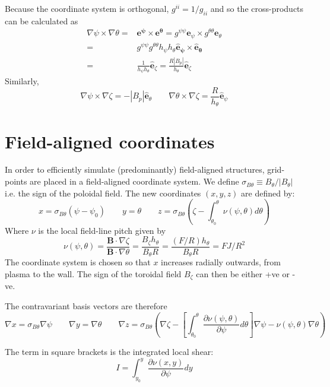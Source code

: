 \documentclass[12pt]{article}
\newcommand{\sbt}{\ensuremath{\sigma_{B\theta}}}
\newcommand{\deriv}[2]{\ensuremath{\frac{\partial #1}{\partial #2}}}
\newcommand{\hthe}{\ensuremath{h_\theta}}
\newcommand{\Bp}{\ensuremath{B_\theta}}
\newcommand{\Bt}{\ensuremath{B_\zeta}}
\begin{document}
Because the coordinate system is orthogonal, $g^{ii} = 1/g_{ii}$ and so the cross-products can be calculated as
\begin{eqnarray*}
\nabla\psi\times\nabla\theta = &\mathbf{e^\psi\times e^\theta} = 
g^{\psi\psi}\mathbf{e}_\psi\times g^{\theta\theta}\mathbf{e}_\theta \nonumber \\
= & g^{\psi\psi}g^{\theta\theta}h_\psi h_\theta\mathbf{\hat{e}_\psi\times\hat{e}_\theta} \nonumber \\
= &\frac{1}{h_\psi h_\theta}\mathbf{\hat{e}}_\zeta 
= \frac{R\left|B_p\right|}{h_\theta}\mathbf{\hat{e}}_\zeta
\end{eqnarray*}
Similarly, 
\[
\nabla\psi\times\nabla\zeta = -\left|B_p\right|\mathbf{\hat{e}}_\theta \qquad
\nabla\theta\times\nabla\zeta = \frac{R}{h_\theta}\mathbf{\hat{e}}_\psi
\]

\section{Field-aligned coordinates}

In order to efficiently simulate (predominantly) field-aligned structures, grid-points
are placed in a field-aligned coordinate system. We define $\sigma_{B\theta} \equiv B_\theta / \left|B_\theta\right|$
i.e. the sign of the poloidal field. The new coordinates $\left(x,y,z\right)$ are defined by:
\begin{equation}
x = \sbt\left(\psi - \psi_0\right) \qquad y = \theta \qquad z = \sigma_{B\theta}\left(\zeta - \int_{\theta_0}^{\theta}\nu\left(\psi, \theta\right)d\theta\right)
\label{eq:coordtransform}
\end{equation}
Where $\nu$ is the local field-line pitch given by
\begin{equation}
\nu\left(\psi, \theta\right) = \frac{\mathbf{B}\cdot\nabla\zeta}{\mathbf{B}\cdot\nabla\theta} = \frac{\Bt\hthe}{\Bp R} = \frac{\left(F/R\right)h_\theta}{B_\theta R} = FJ/R^2
\end{equation}
The coordinate system is chosen so that $x$ increases radially outwards, from plasma to the wall.
The sign of the toroidal field $\Bt$ can then be either +ve or -ve.

The contravariant basis vectors are therefore
\[
\nabla x = \sbt\nabla \psi \qquad \nabla y = \nabla \theta \qquad \nabla z = \sbt\left(\nabla\zeta - \left[\int_{\theta_0}^\theta\deriv{\nu\left(\psi, \theta\right)}{\psi} d\theta\right] \nabla\psi - \nu\left(\psi, \theta\right)\nabla\theta\right)
\]

The term in square brackets is the integrated local shear:
\[
I = \int_{y_0}^y\frac{\partial\nu\left(x, y\right)}{\partial\psi}dy
\]
\end{document}

